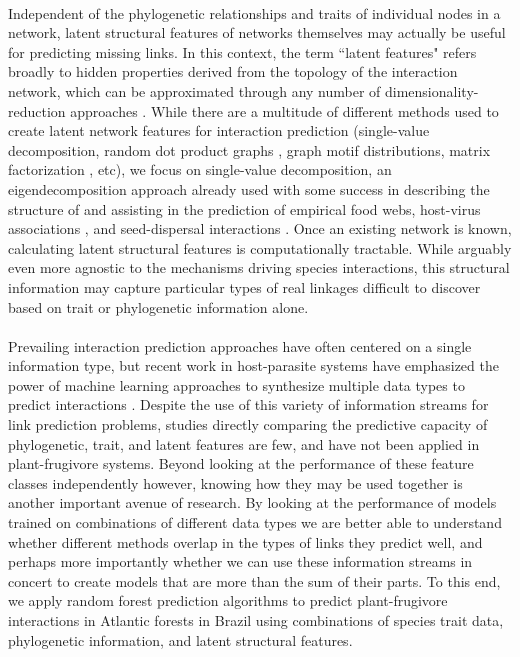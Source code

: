 \paragraph*{}
Independent of the phylogenetic relationships and traits of individual nodes in a network, latent structural features of networks themselves may actually be useful for predicting missing links. In this context, the term ``latent features" refers broadly to hidden properties derived from the topology of the interaction network, which can be approximated through any number of dimensionality-reduction approaches \parencite{poisot2021imputing}. While there are a multitude of different methods used to create latent network features for interaction prediction (single-value decomposition, random dot product graphs \parencite{strydom2022food}, graph motif distributions, matrix factorization \parencite{seo2018predicting}, etc), we focus on single-value decomposition, an eigendecomposition approach already used with some success in describing the structure of and assisting in the prediction of empirical food webs, \parencite{banville2023constrains} host-virus associations \parencite{poisot2021imputing, poisot2023network}, and seed-dispersal interactions \parencite{nunes2024estimated}. Once an existing network is known, calculating latent structural features is computationally tractable. While arguably even more agnostic to the mechanisms driving species interactions, this structural information may capture particular types of real linkages difficult to discover based on trait or phylogenetic information alone. 


\paragraph*{}
Prevailing interaction prediction approaches have often centered on a single information type, but recent work in host-parasite systems have emphasized the power of machine learning approaches to synthesize multiple data types to predict interactions \parencite{strydom2021roadmap}. Despite the use of this variety of information streams for link prediction problems, studies directly comparing the predictive capacity of phylogenetic, trait, and latent features are few, and have not been applied in plant-frugivore systems. Beyond looking at the performance of these feature classes independently however, knowing how they may be used together is another important avenue of research. By looking at the performance of models trained on combinations of different data types we are better able to understand whether different methods overlap in the types of links they predict well, and perhaps more importantly whether we can use these information streams in concert to create models that are more than the sum of their parts. To this end, we apply random forest prediction algorithms to predict plant-frugivore interactions in Atlantic forests in Brazil using combinations of species trait data, phylogenetic information, and latent structural features. 

